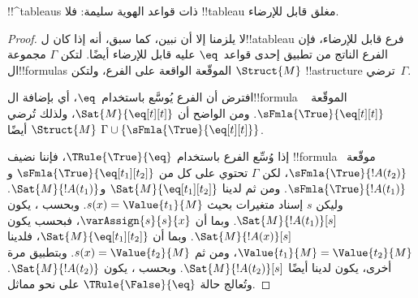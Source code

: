 \documentclass[../../../include/open-logic-section]{subfiles}
\begin{document}


\begin{prop}
!!^{tableau}s ذات قواعد الهوية سليمة: فلا !!{tableau} مغلق قابل للإرضاء.
\end{prop}

\begin{proof}
لا يلزمنا إلا أن نبين، كما سبق، أنه إذا كان ل!!a{tableau} فرع قابل
للإرضاء، فإن الفرع الناتج من تطبيق إحدى قواعد~$\eq$ عليه قابل للإرضاء
أيضًا. لتكن $\Gamma$ مجموعة ال!!{formula}s الموقّعة الواقعة على الفرع،
ولتكن $\Struct{M}$ !!a{structure} ترضي~$\Gamma$.

افترض أن الفرع يُوسَّع باستخدام~$\eq$، أي بإضافة ال!!{formula} الموقّعة
~$\sFmla{\True}{\eq[t][t]}$. ومن الواضح أن
$\Sat{M}{\eq[t][t]}$، ولذلك تُرضي $\Struct{M}$ أيضًا $\Gamma \cup
\{\sFmla{\True}{\eq[t][t]}\}$.

إذا وُسِّع الفرع باستخدام $\TRule{\True}{\eq}$، فإننا نضيف !!{formula}
موقّعة~$\sFmla{\True}{!A(t_2)}$، لكن $\Gamma$ تحتوي على كل من
$\sFmla{\True}{\eq[t_1][t_2]}$ و$\sFmla{\True}{!A(t_1)}$. ومن ثم لدينا
$\Sat{M}{\eq[t_1][t_2]}$ و$\Sat{M}{!A(t_1)}$. وليكن $s$ إسناد متغيرات
بحيث $s(x) = \Value{t_1}{M}$. وبحسب
، يكون $\Sat{M}{!A(t_1)}[s]$.
وبما أن $\varAssign{s}{s}{x}$، فبحسب
 يكون $\Sat{M}{!A(x)}[s]$. وبما أن
$\Sat{M}{\eq[t_1][t_2]}$، فلدينا $\Value{t_1}{M} = \Value{t_2}{M}$،
ومن ثم $s(x) = \Value{t_2}{M}$. وبتطبيق
 مرة أخرى، يكون لدينا أيضًا
$\Sat{M}{!A(t_2)}[s]$. وبحسب ،
يكون $\Sat{M}{!A(t_2)}$. وتُعالج حالة $\TRule{\False}{\eq}$ على نحو مماثل.
\end{proof}
\end{document}

